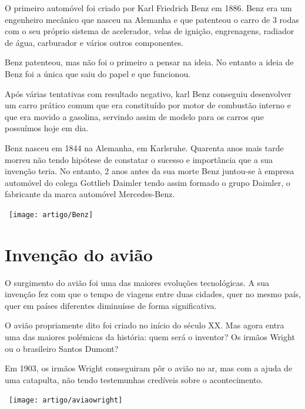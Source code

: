 \documentclass{report}
\begin{document}
O primeiro automóvel foi criado por Karl Friedrich Benz em 1886.
Benz era um engenheiro mecânico que nasceu na Alemanha e que patenteou o carro de 3 rodas com o seu próprio sistema de acelerador, velas de ignição, engrenagens, radiador de água, carburador e vários outros componentes.

Benz patenteou, mas não foi o primeiro a pensar na ideia. No entanto a ideia de Benz foi a única que saiu do papel e que funcionou.

Após várias tentativas com resultado negativo, karl Benz conseguiu desenvolver um carro prático comum que era constituído por motor de combustão interno e que era movido a gasolina, servindo assim de modelo para os carros que possuímos hoje em dia.

Benz nasceu em 1844 na Alemanha, em Karlsruhe. Quarenta anos mais tarde morreu não tendo hipótese de constatar o sucesso e importância que a sua invenção teria.
No entanto, 2 anos antes da sua morte Benz juntou-se à empresa automóvel do colega Gottlieb Daimler tendo assim formado o grupo Daimler, o fabricante da marca automóvel Mercedes-Benz.

\begin{center}
\ \texttt{[image: artigo/Benz]}
\end{center}
 \begin{figure}[h]
 	\centerline{}
 \end{figure}

\chapter{Invenção do avião}
O surgimento do avião foi uma das maiores evoluções tecnológicas. A sua invenção fez com que o tempo de viagens entre duas cidades, quer no mesmo país, quer em países diferentes diminuísse de forma significativa.

O avião propriamente dito foi criado no início do século XX. Mas agora  entra uma das maiores polémicas da história: quem será o inventor? Os irmãos Wright ou o brasileiro Santos Dumont?

Em 1903, os irmãos Wright conseguiram pôr o avião no ar, mas com a ajuda de uma catapulta, não tendo testemunhas credíveis sobre o acontecimento.

\begin{center}
\ \texttt{[image: artigo/aviaowright]}
\end{center}
 \begin{figure}[h]
 	\centerline{}
 \end{figure}
\end{document}
